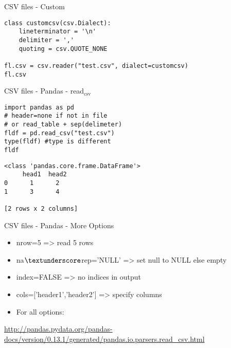 \documentclass[presentation]{beamer}
\begin{document}
\begin{frame}[fragile,label=sec-4-1-23]{CSV files - Custom}
 \lstset{numbers=left,language=Python,label= ,caption= }
\begin{lstlisting}
class customcsv(csv.Dialect):
    lineterminator = '\n'
    delimiter = ','
    quoting = csv.QUOTE_NONE

fl.csv = csv.reader("test.csv", dialect=customcsv)
fl.csv
\end{lstlisting}
\end{frame}

\begin{frame}[fragile,label=sec-4-1-24]{CSV files - Pandas - read$_{\text{csv}}$}
 \lstset{numbers=left,language=Python,label= ,caption= }
\begin{lstlisting}
import pandas as pd
# header=none if not in file
# or read_table + sep(delimeter)
fldf = pd.read_csv("test.csv")
type(fldf) #type is different
fldf
\end{lstlisting}

\lstset{numbers=left,language=Python,label= ,caption= }
\begin{lstlisting}
<class 'pandas.core.frame.DataFrame'>
     head1  head2
0      1      2
1      3      4

[2 rows x 2 columns]
\end{lstlisting}
\end{frame}

\begin{frame}[label=sec-4-1-25]{CSV files - Pandas - More Options}
\begin{itemize}
\item nrow=5 => read 5 rows
\item na\(\textunderscore\)rep='NULL' => set null to NULL else empty
\item index=FALSE => no indices in output
\item cols=['header1','header2'] => specify columns
\item For all options:
\end{itemize}
\url{http://pandas.pydata.org/pandas-docs/version/0.13.1/generated/pandas.io.parsers.read_csv.html}
\end{frame}
\end{document}

